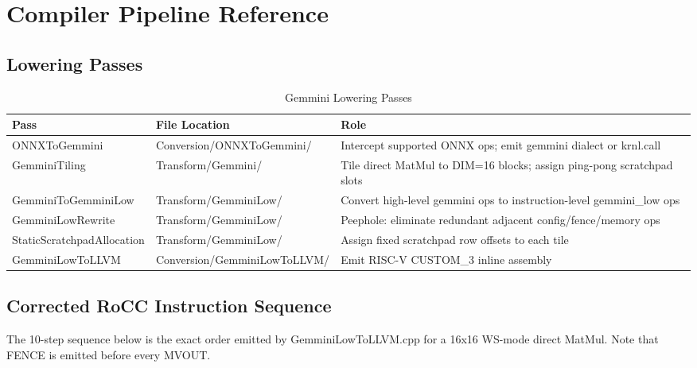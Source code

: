 \documentclass[12pt,a4paper]{article}
\begin{document}
\section{Compiler Pipeline Reference}

\subsection{Lowering Passes}

\begin{table}[H]
\centering
\begin{tabular}{|p{}|p{}|p{}|}
\hline
\textbf{Pass} & \textbf{File Location} & \textbf{Role} \\
\hline
ONNXToGemmini & Conversion/ONNXToGemmini/ & Intercept supported ONNX ops; emit gemmini dialect or krnl.call \\
\hline
GemminiTiling & Transform/Gemmini/ & Tile direct MatMul to DIM=16 blocks; assign ping-pong scratchpad slots \\
\hline
GemminiToGemminiLow & Transform/GemminiLow/ & Convert high-level gemmini ops to instruction-level gemmini\_low ops \\
\hline
GemminiLowRewrite & Transform/GemminiLow/ & Peephole: eliminate redundant adjacent config/fence/memory ops \\
\hline
StaticScratchpadAllocation & Transform/GemminiLow/ & Assign fixed scratchpad row offsets to each tile \\
\hline
GemminiLowToLLVM & Conversion/GemminiLowToLLVM/ & Emit RISC-V CUSTOM\_3 inline assembly \\
\hline
\end{tabular}
\caption{Gemmini Lowering Passes}
\end{table}

\subsection{Corrected RoCC Instruction Sequence}

The 10-step sequence below is the exact order emitted by GemminiLowToLLVM.cpp for a 16x16 WS-mode direct MatMul. Note that FENCE is emitted before every MVOUT.
\end{document}

